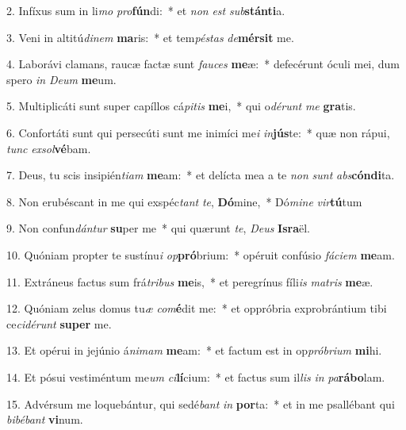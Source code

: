 2. Infíxus sum in li\textit{mo} \textit{pro}\textbf{fún}di:~*  et \textit{non} \textit{est} \textit{sub}\textbf{stán}\textbf{ti}a.\

3. Veni in altitú\textit{di}\textit{nem} \textbf{ma}ris:~*  et tem\textit{pés}\textit{tas} \textit{de}\textbf{mér}\textbf{sit} me.\

4. Laborávi clamans, raucæ factæ sunt \textit{fau}\textit{ces} \textbf{me}æ:~*  defecérunt óculi mei, dum spero \textit{in} \textit{De}\textit{um} \textbf{me}um.\

5. Multiplicáti sunt super capíllos cá\textit{pi}\textit{tis} \textbf{me}i,~*  qui o\textit{dé}\textit{runt} \textit{me} \textbf{gra}tis.\

6. Confortáti sunt qui persecúti sunt me inimíci me\textit{i} \textit{in}\textbf{jús}te:~*  quæ non rápui, \textit{tunc} \textit{ex}\textit{sol}\textbf{vé}bam.\

7. Deus, tu scis insipién\textit{ti}\textit{am} \textbf{me}am:~*  et delícta mea a te \textit{non} \textit{sunt} \textit{abs}\textbf{cón}\textbf{di}ta.\

8. Non erubéscant in me qui exspéc\textit{tant} \textit{te}, \textbf{Dó}mine,~*  Dó\textit{mi}\textit{ne} \textit{vir}\textbf{tú}tum\

9. Non confun\textit{dán}\textit{tur} \textbf{su}per me~*  qui quærunt \textit{te}, \textit{De}\textit{us} \textbf{Is}\textbf{ra}ël.\

10. Quóniam propter te sustínu\textit{i} \textit{op}\textbf{pró}brium:~*  opéruit confúsio \textit{fá}\textit{ci}\textit{em} \textbf{me}am.\

11. Extráneus factus sum frá\textit{tri}\textit{bus} \textbf{me}is,~*  et peregrínus fíli\textit{is} \textit{ma}\textit{tris} \textbf{me}æ.\

12. Quóniam zelus domus tu\textit{æ} \textit{com}\textbf{é}dit me:~*  et oppróbria exprobrántium tibi ce\textit{ci}\textit{dé}\textit{runt} \textbf{su}\textbf{per} me.\

13. Et opérui in jejúnio á\textit{ni}\textit{mam} \textbf{me}am:~*  et factum est in op\textit{pró}\textit{bri}\textit{um} \textbf{mi}hi.\

14. Et pósui vestiméntum me\textit{um} \textit{ci}\textbf{lí}cium:~*  et factus sum il\textit{lis} \textit{in} \textit{pa}\textbf{rá}\textbf{bo}lam.\

15. Advérsum me loquebántur, qui sedé\textit{bant} \textit{in} \textbf{por}ta:~*  et in me psallébant qui \textit{bi}\textit{bé}\textit{bant} \textbf{vi}num.\

